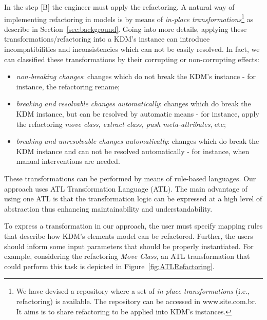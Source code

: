 In the step [B] the engineer must apply the refactoring. A natural way of implementing refactoring in models is by means of \textit{in-place transformations}\footnote{We have devised a repository where a set of \textit{in-place transformations} (i.e., refactoring) is available. The repository can be accessed in www.site.com.br. It aims is to share refactoring to be applied into KDM's instances.} as describe in Section~\ref{sec:background}. %
Going into more details, applying these transformations/refactoring into a KDM's instance can introduce incompatibilities and inconsistencies which can not be easily resolved. In fact, we can classified these transformations by their corrupting or non-corrupting effects:%

\begin{itemize}
\item \textit{non-breaking changes}: changes which do not break the KDM's instance - for instance, the refactoring rename;

\item \textit{breaking and resolvable changes automatically}: changes which do break the KDM instance, but can be resolved by automatic means - for instance, apply the refactoring \textit{move class, extract class, push meta-attributes}, etc;

\item \textit{breaking and unresolvable changes automatically}: changes which do break the KDM instance and can not be resolved automatically - for instance, when manual interventions are needed.
%
\end{itemize} 
%
These transformations can be performed by means of rule-based languages. Our approach uses ATL Transformation Language (ATL). The main advantage of using one ATL is that the transformation logic can be expressed at a high level of abstraction thus enhancing maintainability and understandability. 

To express a transformation in our approach, the user must specify mapping rules that describe how KDM's elements model can be refactored. Further, the users should inform some input parameters that should be properly instantiated. For example, considering the refactoring \textit{Move Class}, an ATL transformation that could perform this task is depicted in Figure~\ref{fig:ATLRefactoring}.









